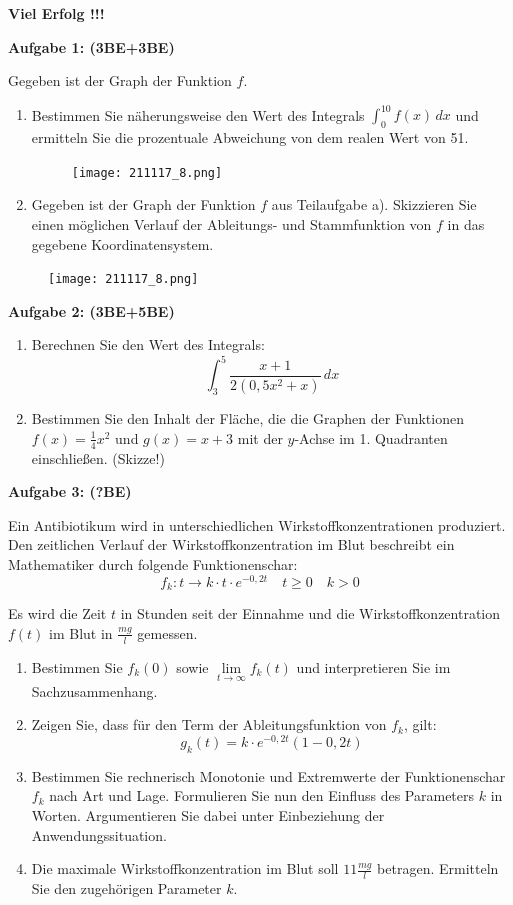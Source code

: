 \documentclass[a4paper,12pt]{article}
\newcommand{\Aufgabe}[1]{
  {
  \vspace*{0.5cm}
  \textsf{\textbf{Aufgabe #1}}
  \vspace*{0.2cm}
  
  }
}
\begin{document}
\vspace{5cm}
\centerline{\huge\bfseries\sffamily Viel Erfolg !!!}

\newpage

\Aufgabe{1: (3BE+3BE)} 
Gegeben ist der Graph der Funktion $f$. 
\begin{enumerate}[label={\alph*)}] 
  \item Bestimmen Sie näherungsweise den Wert des Integrals ${\int_{0}^{10} f(x)\, dx}$ und ermitteln Sie die prozentuale Abweichung von dem realen Wert von 51.
\begin{figure}[H]
  \centering
  \texttt{[image: 211117\_8.png]}
\end{figure}
\newpage
  \item Gegeben ist der Graph der Funktion $f$ aus Teilaufgabe a). Skizzieren Sie einen möglichen Verlauf der Ableitungs- und Stammfunktion von $f$ in das gegebene Koordinatensystem.
\end{enumerate}
\begin{figure}[H]
  \centering
  \texttt{[image: 211117\_8.png]}
\end{figure}


\vspace{3cm}

\Aufgabe{2: (3BE+5BE)} 
\begin{enumerate}[label={\alph*)}] 
  \item Berechnen Sie den Wert des Integrals:
    \[ \int_{3}^{5} \frac{x+1}{2(0,5x^2+x)}\,dx \]
  \item Bestimmen Sie den Inhalt der Fläche, die die Graphen der Funktionen ${f(x)= \frac{1}{4}x^2}$ und ${g(x) = x+3}$ mit der $y$-Achse im 1. Quadranten einschließen. (Skizze!)
\end{enumerate}

\Aufgabe{3: (?BE)} 
Ein Antibiotikum wird in unterschiedlichen Wirkstoffkonzentrationen produziert. Den zeitlichen Verlauf der Wirkstoffkonzentration im Blut beschreibt ein Mathematiker durch folgende Funktionenschar:
\[f_k: t \rightarrow  k \cdot t \cdot e^{-0,2t} \quad  t\ge0 \quad k>0 \]

Es wird die Zeit $t$ in Stunden seit der Einnahme und die Wirkstoffkonzentration $f(t)$ im Blut in $\frac{mg}{l}$ gemessen.

\begin{enumerate}[label={\alph*)}]
  \item Bestimmen Sie $f_k(0)$ sowie $\lim \limits_{t \to \infty} f_k(t)$ und interpretieren Sie im Sachzusammenhang.
  \item Zeigen Sie, dass für den Term der Ableitungsfunktion von $f_k$, gilt: 
    \[g_k (t) = k \cdot e^{-0,2t} (1-0,2t) \]
  \item Bestimmen Sie rechnerisch Monotonie und Extremwerte der Funktionenschar $f_k$ nach Art und Lage. 
    Formulieren Sie nun den Einfluss des Parameters $k$ in Worten. Argumentieren Sie dabei unter Einbeziehung der Anwendungssituation.
  \item Die maximale Wirkstoffkonzentration im Blut soll $11\frac{mg}{l}$ betragen. Ermitteln Sie den zugehörigen Parameter $k$.
\end{enumerate}
\end{document}
